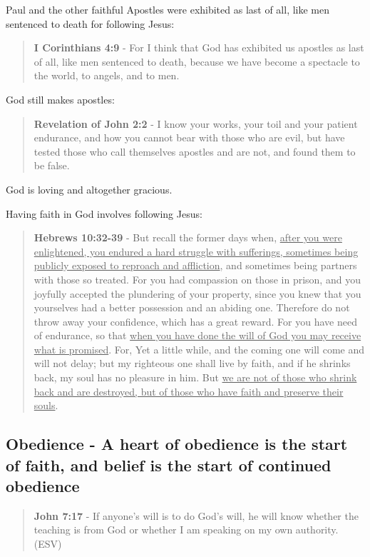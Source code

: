 \documentclass[11pt]{article}
\begin{document}
Paul and the other faithful Apostles were exhibited as last of all, like men sentenced to death for following Jesus:

\begin{quote}
\textbf{I Corinthians 4:9} - For I think that God has exhibited us apostles as last of all, like men sentenced to death, because we have become a spectacle to the world, to angels, and to men.
\end{quote}

God still makes apostles:

\begin{quote}
\textbf{Revelation of John 2:2} - I know your works, your toil and your patient endurance, and how you cannot bear with those who are evil, but have tested those who call themselves apostles and are not, and found them to be false.
\end{quote}

God is loving and altogether gracious.

Having faith in God involves following Jesus:

\begin{quote}
\textbf{Hebrews 10:32-39} - But recall the former days when, \uline{after you were enlightened, you endured a hard struggle with sufferings, sometimes being publicly exposed to reproach and affliction}, and sometimes being partners with those so treated. For you had compassion on those in prison, and you joyfully accepted the plundering of your property, since you knew that you yourselves had a better possession and an abiding one. Therefore do not throw away your confidence, which has a great reward. For you have need of endurance, so that \uline{when you have done the will of God you may receive what is promised}. For, Yet a little while, and the coming one will come and will not delay; but my righteous one shall live by faith, and if he shrinks back, my soul has no pleasure in him. But \uline{we are not of those who shrink back and are destroyed, but of those who have faith and preserve their souls}.
\end{quote}

\subsection{Obedience - A heart of obedience is the start of faith, and belief is the start of continued obedience}
\label{sec:orgcaeaa22}
\begin{quote}
\textbf{John 7:17} -  If anyone's will is to do God's will, he will know whether the teaching is from God or whether I am speaking on my own authority. (ESV)
\end{quote}
\end{document}
